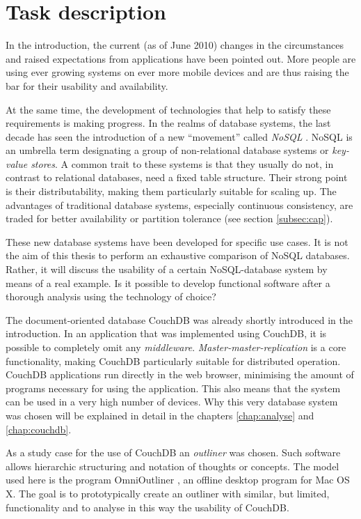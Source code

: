 \chapter{Task description}
\label{chap:aufgabenstellung}

In the introduction, the current (as of June 2010) changes in the circumstances and raised expectations from applications have been pointed out. More people are using ever growing systems on ever more mobile devices and are thus raising the bar for their usability and availability.

At the same time, the development of technologies that help to satisfy these requirements is making progress. In the realms of database systems, the last decade has seen the introduction of a new \enquote{movement} called \textit{NoSQL} \cite{nosql:strozzi}. NoSQL is an umbrella term designating a group of non-relational database systems or \textit{key-value stores}. A common trait to these systems is that they usually do not, in contrast to relational databases, need a fixed table structure. Their strong point is their distributability, making them particularly suitable for scaling up. The advantages of traditional database systems, especially continuous consistency, are traded for better availability or partition tolerance (see section \ref{subsec:cap}).

These new database systems have been developed for specific use cases. It is not the aim of this thesis to perform an exhaustive comparison of NoSQL databases. Rather, it will discuss the usability of a certain NoSQL-database system by means of a real example. Is it possible to develop functional software after a thorough analysis using the technology of choice?

The document-oriented database CouchDB \cite{couch:homepage} was already shortly introduced in the introduction. In an application that was implemented using CouchDB, it is possible to completely omit any \textit{middleware}. \textit{Master-master-replication} is a core functionality, making CouchDB particularly suitable for distributed operation. CouchDB applications run directly in the web browser, minimising the amount of programs necessary for using the application. This also means that the system can be used in a very high number of devices. Why this very database system was chosen will be explained in detail in the chapters \ref{chap:analyse} and \ref{chap:couchdb}.

As a study case for the use of CouchDB an \textit{outliner} was chosen. Such software allows hierarchic structuring and notation of thoughts or concepts. The model used here is the program OmniOutliner \cite{omnioutliner:website}, an offline desktop program for Mac OS X. The goal is to prototypically create an outliner with similar, but limited, functionality and to analyse in this way the usability of CouchDB.

